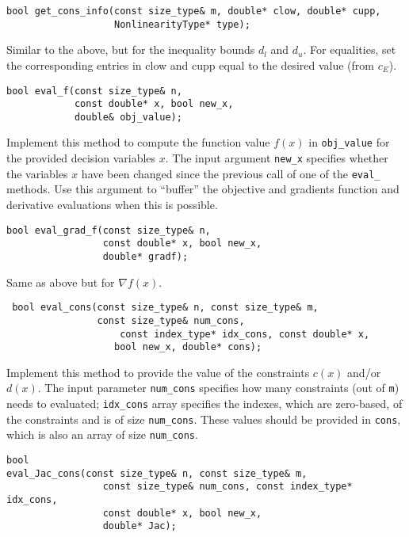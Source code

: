 \documentclass[11pt]{article}
\newcounter{line}
\begin{document}
\begin{lstlisting} 
bool get_cons_info(const size_type& m, double* clow, double* cupp, 
                   NonlinearityType* type);
\end{lstlisting}
\noindent Similar to the above, but for the inequality bounds $d_l$ and $d_u$. For equalities, set the corresponding entries in clow and cupp equal to the desired value (from $c_E$).


\begin{lstlisting} 
bool eval_f(const size_type& n, 
            const double* x, bool new_x, 
            double& obj_value);
\end{lstlisting} 

\noindent Implement this method to compute the function value $f(x)$ in \texttt{obj\_value} for the provided decision variables $x$. The input argument \texttt{new\_x} specifies whether the variables $x$ have been changed since the previous call of one of the \texttt{eval\_} methods. Use this argument to ``buffer'' the objective and gradients function and derivative evaluations when this is possible.

\begin{lstlisting} 
bool eval_grad_f(const size_type& n, 
                 const double* x, bool new_x, 
                 double* gradf);
\end{lstlisting} 

\noindent Same as above but for $\nabla f(x)$.

\begin{lstlisting} 
 bool eval_cons(const size_type& n, const size_type& m, 
                const size_type& num_cons,
				    const index_type* idx_cons, const double* x, 
			       bool new_x, double* cons);
\end{lstlisting} 

\noindent Implement this method to provide the value of the constraints $c(x)$ and/or $d(x)$. The input parameter \texttt{num\_cons} specifies how many constraints (out of \texttt{m}) needs to evaluated; \texttt{idx\_cons} array specifies the indexes, which are zero-based, of the constraints  and is of size \texttt{num\_cons}. These values should be provided in \texttt{cons}, which is also an array of size \texttt{num\_cons}.

\begin{lstlisting} 
bool 
eval_Jac_cons(const size_type& n, const size_type& m, 
			     const size_type& num_cons, const index_type* idx_cons,  
			     const double* x, bool new_x,
			     double* Jac);
\end{lstlisting} 
\end{document}
